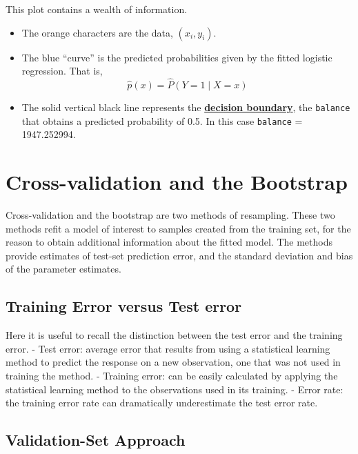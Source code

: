 \documentclass[]{report}
\providecommand{\tightlist}{%
  \setlength{\itemsep}{0pt}\setlength{\parskip}{0pt}}
\begin{document}
This plot contains a wealth of information.

\begin{itemize}
\tightlist
\item
  The orange \texttt{\textbar{}} characters are the data,
  \((x_i, y_i)\).
\item
  The blue ``curve'' is the predicted probabilities given by the fitted
  logistic regression. That is,
  \[\hat{p}(x) = \hat{P}(Y = 1 \mid { X = x})\]
\item
  The solid vertical black line represents the
  \textbf{\href{https://en.wikipedia.org/wiki/Decision_boundary}{decision
  boundary}}, the \texttt{balance} that obtains a predicted probability
  of 0.5. In this case \texttt{balance} = 1947.252994.
\end{itemize}

\chapter{Cross-validation and the
Bootstrap}\label{cross-validation-and-the-bootstrap}

Cross-validation and the bootstrap are two methods of resampling. These
two methods refit a model of interest to samples created from the
training set, for the reason to obtain additional information about the
fitted model. The methods provide estimates of test-set prediction
error, and the standard deviation and bias of the parameter estimates.

\section{Training Error versus Test
error}\label{training-error-versus-test-error}

Here it is useful to recall the distinction between the test error and
the training error. - Test error: average error that results from using
a statistical learning method to predict the response on a new
observation, one that was not used in training the method. - Training
error: can be easily calculated by applying the statistical learning
method to the observations used in its training. - Error rate: the
training error rate can dramatically underestimate the test error rate.

\section{Validation-Set Approach}\label{validation-set-approach}
\end{document}
